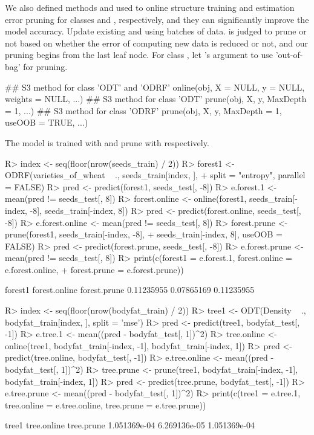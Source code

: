 \documentclass[nojss]{jss}
\newcommand{\fct}[1]{\code{#1()}}
\numberwithin{equation}{section}
\begin{document}
We also defined  methods  and  used to online structure training and estimation error pruning for classes  and , respectively, and they can significantly improve the model accuracy.  Update existing  and  using batches of data.  is judged to prune or not based on whether the error of computing new data is reduced or not, and our pruning begins from the last leaf node. For class , let 's argument  to use 'out-of-bag' for pruning.
\begin{Code}
## S3 method for class 'ODT' and 'ODRF'
online(obj, X = NULL, y = NULL, weights = NULL, ...)
## S3 method for class 'ODT'
prune(obj, X, y, MaxDepth = 1, ...)
## S3 method for class 'ODRF'
prune(obj, X, y, MaxDepth = 1, useOOB = TRUE, ...)
\end{Code}
%
The model is trained with \fct{online} and prune with \fct{prune} respectively.
%
\begin{Schunk}
\begin{Sinput}
R> index <- seq(floor(nrow(seeds_train) / 2))
R> forest1 <- ODRF(varieties_of_wheat ~ ., seeds_train[index, ],
+    split = "entropy", parallel = FALSE)
R> pred <- predict(forest1, seeds_test[, -8])
R> e.forest.1 <- mean(pred != seeds_test[, 8])
R> forest.online <- online(forest1, seeds_train[-index, -8], seeds_train[-index, 8])
R> pred <- predict(forest.online, seeds_test[, -8])
R> e.forest.online <- mean(pred != seeds_test[, 8])
R> forest.prune <- prune(forest1, seeds_train[-index, -8],
+    seeds_train[-index, 8], useOOB = FALSE)
R> pred <- predict(forest.prune, seeds_test[, -8])
R> e.forest.prune <- mean(pred != seeds_test[, 8])
R> print(c(forest1 = e.forest.1, forest.online = e.forest.online,
+    forest.prune = e.forest.prune))
\end{Sinput}
\begin{Soutput}
      forest1 forest.online  forest.prune 
   0.11235955    0.07865169    0.11235955 
\end{Soutput}
\begin{Sinput}
R> index <- seq(floor(nrow(bodyfat_train) / 2))
R> tree1 <- ODT(Density ~ ., bodyfat_train[index, ], split = 'mse')
R> pred <- predict(tree1, bodyfat_test[, -1])
R> e.tree.1 <- mean((pred - bodyfat_test[, 1])^2)
R> tree.online <- online(tree1, bodyfat_train[-index, -1], bodyfat_train[-index, 1])
R> pred <- predict(tree.online, bodyfat_test[, -1])
R> e.tree.online <- mean((pred - bodyfat_test[, 1])^2)
R> tree.prune <- prune(tree1, bodyfat_train[-index, -1], bodyfat_train[-index, 1])
R> pred <- predict(tree.prune, bodyfat_test[, -1])
R> e.tree.prune <- mean((pred - bodyfat_test[, 1])^2)
R> print(c(tree1 = e.tree.1, tree.online = e.tree.online, tree.prune = e.tree.prune))
\end{Sinput}
\begin{Soutput}
       tree1  tree.online   tree.prune 
1.051369e-04 6.269136e-05 1.051369e-04 
\end{Soutput}
\end{Schunk}
\end{document}
